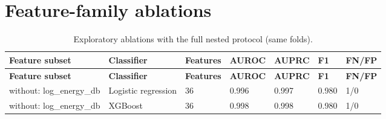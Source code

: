 \documentclass[11pt,a4paper]{article}
\begin{document}
\section{Feature-family ablations}\label{sec:app-ablation}
\begin{center}\scriptsize\renewcommand{\arraystretch}{1.15}
\begin{longtable}{>{\raggedright\arraybackslash}p{4.26cm}>{\raggedright\arraybackslash}p{1.55cm}>{\raggedleft\arraybackslash}p{1.55cm}>{\raggedleft\arraybackslash}p{1.55cm}>{\raggedleft\arraybackslash}p{1.55cm}>{\raggedleft\arraybackslash}p{1.55cm}>{\raggedright\arraybackslash}p{1.55cm}}
\caption{Exploratory ablations with the full nested protocol (same folds).}\\
\toprule
\textbf{\hspace{0pt}Feature subset} & \textbf{\hspace{0pt}Classifier} & \textbf{\hspace{0pt}Features} & \textbf{\hspace{0pt}AUROC} & \textbf{\hspace{0pt}AUPRC} & \textbf{\hspace{0pt}F1} & \textbf{\hspace{0pt}FN/\allowbreak{}FP}\\\midrule\endfirsthead
\toprule
\textbf{\hspace{0pt}Feature subset} & \textbf{\hspace{0pt}Classifier} & \textbf{\hspace{0pt}Features} & \textbf{\hspace{0pt}AUROC} & \textbf{\hspace{0pt}AUPRC} & \textbf{\hspace{0pt}F1} & \textbf{\hspace{0pt}FN/\allowbreak{}FP}\\\midrule\endhead
\bottomrule\endfoot
\hspace{0pt}without: log\_\allowbreak{}energy\_\allowbreak{}db & \hspace{0pt}Logistic regression & \hspace{0pt}36 & \hspace{0pt}0.996 & \hspace{0pt}0.997 & \hspace{0pt}0.980 & \hspace{0pt}1/\allowbreak{}0\\
\hspace{0pt}without: log\_\allowbreak{}energy\_\allowbreak{}db & \hspace{0pt}XGBoost & \hspace{0pt}36 & \hspace{0pt}0.998 & \hspace{0pt}0.998 & \hspace{0pt}0.980 & \hspace{0pt}1/\allowbreak{}0\\

\end{longtable}
\end{center}
\end{document}
